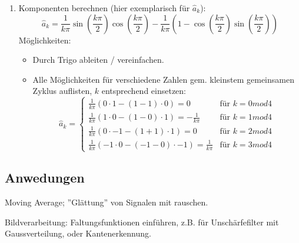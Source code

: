 \begin{enumerate}
\item Komponenten berechnen (hier exemplarisch für $\hat{a}_k$): 
	\[
	\hat{a}_k = \frac{1}{k\pi} \sin\left(\frac{k\pi}{2}\right) \cos\left(\frac{k\pi}{2}\right) - \frac{1}{k\pi}\left(1- \cos\left(\frac{k\pi}{2}\right) \sin\left(\frac{k\pi}{2}\right)\right)
		\]
		Möglichkeiten: \begin{itemize}
			\item Durch Trigo ableiten / vereinfachen.
			\item Alle Möglichkeiten für verschiedene Zahlen gem. kleinstem gemeinsamen Zyklus auflisten, $k$ entsprechend einsetzen: \[
			\hat{a}_k = \begin{cases}
				\frac{1}{k\pi} (0 \cdot 1 - (1 - 1) \cdot 0) = 0 & \text{für } k=0 mod 4 \\
				\frac{1}{k\pi} (1 \cdot 0 - (1 - 0) \cdot 1) = -\frac{1}{k\pi} & \text{für } k=1 mod 4 \\
				\frac{1}{k\pi} (0 \cdot -1 - (1 + 1) \cdot 1) = 0 & \text{für } k=2 mod 4 \\
				\frac{1}{k\pi} (-1 \cdot 0 - (-1 -0) \cdot -1) = \frac{1}{k\pi} & \text{für } k=3 mod 4
			\end{cases}
			\]
		\end{itemize}
\end{enumerate}

\subsection{Anwedungen}

Moving Average; ''Glättung'' von Signalen mit rauschen.

Bildverarbeitung: Faltungsfunktionen einführen, z.B. für Unschärfefilter mit Gaussverteilung, oder Kantenerkennung.


